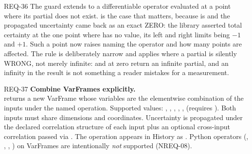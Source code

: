 \begin{reqbox}{REQ-36}{\stable}
The guard extends to a differentiable operator evaluated at a point
where its partial does not exist.  is the case that matters,
because  is  and the propagated uncertainty
came back as an exact ZERO: the library asserted total certainty at the
one point where  has no value, its left and right limits
being $-1$ and $+1$. Such a point now raises
 naming the operator and how many
points are affected. The rule is deliberately narrow and applies where
a partial is silently WRONG, not merely infinite:  and
 at zero return an infinite partial, and an infinity in the
result is not something a reader mistakes for a measurement.
\end{reqbox}

\begin{reqbox}{REQ-37}{\stable}
\textbf{Combine VarFrames explicitly.}\\
 returns a new VarFrame whose
variables are the elementwise combination of the inputs under the named
operation. Supported  values: , ,
, , , 
(requires ). Both inputs must share dimensions and
coordinates. Uncertainty is propagated under the declared correlation
structure of each input plus an optional cross-input correlation passed
via . The operation appears in History as
. Python operators
(\code{+}, \code{-}, \code{*}, \code{/}) on VarFrames are intentionally
\emph{not} supported (NREQ-08).
\end{reqbox}

